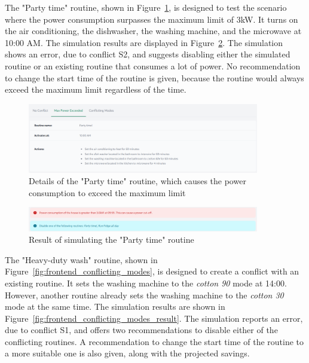 The "Party time" routine, shown in Figure~\ref{fig:frontend_max_power_exceeded}, is designed to test the scenario where the power consumption surpasses the maximum limit of 3kW. It turns on the air conditioning, the dishwasher, the washing machine, and the microwave at 10:00 AM. The simulation results are displayed in Figure~\ref{fig:frontend_max_power_exceeded_result}. The simulation shows an error, due to conflict S2, and suggests disabling either the simulated routine or an existing routine that consumes a lot of power. No recommendation to change the start time of the routine is given, because the routine would always exceed the maximum limit regardless of the time.

\begin{figure}
    \centering
    \includegraphics[width=0.9\textwidth]{images/frontend/max_power_exceeded.png}
    \caption{Details of the "Party time" routine, which causes the power consumption to exceed the maximum limit}
    \label{fig:frontend_max_power_exceeded}
\end{figure}

\begin{figure}
    \centering
    \includegraphics[width=0.9\textwidth]{images/frontend/max_power_exceeded_result.png}
    \caption{Result of simulating the "Party time" routine}
    \label{fig:frontend_max_power_exceeded_result}
\end{figure}

The "Heavy-duty wash" routine, shown in Figure~\ref{fig:frontend_conflicting_modes}, is designed to create a conflict with an existing routine. It sets the washing machine to the \textit{cotton 90} mode at 14:00. However, another routine already sets the washing machine to the \textit{cotton 30} mode at the same time. The simulation results are shown in Figure~\ref{fig:frontend_conflicting_modes_result}. The simulation reports an error, due to conflict S1, and offers two recommendations to disable either of the conflicting routines. A recommendation to change the start time of the routine to a more suitable one is also given, along with the projected savings.

